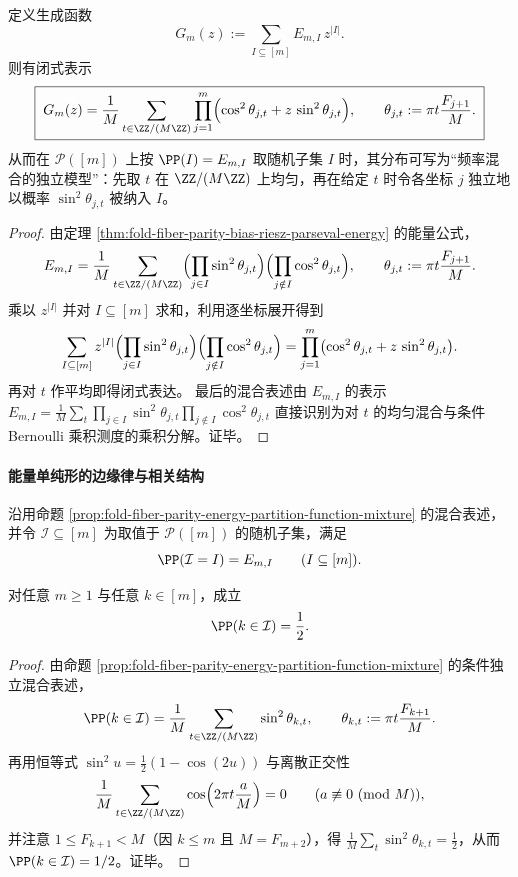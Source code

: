 \begin{proposition}[奇偶能量的生成函数与频率混合的独立模型]\label{prop:fold-fiber-parity-energy-partition-function-mixture}
定义生成函数
\[
G_m(z):=\sum_{I\subseteq[m]}E_{m,I}\,z^{|I|}.
\]
则有闭式表示
\[
\boxed{\;
G_m(z)=\frac1{M}\sum_{t\in\ZZ/(M\ZZ)}
\prod_{j=1}^{m}\Bigl(\cos^2\theta_{j,t}+z\,\sin^2\theta_{j,t}\Bigr),\qquad
\theta_{j,t}:=\pi t\frac{F_{j+1}}{M}.\;}
\]
从而在 \(\mathcal P([m])\) 上按 \(\PP(I)=E_{m,I}\) 取随机子集 \(I\) 时，其分布可写为“频率混合的独立模型”：先取 \(t\) 在 \(\ZZ/(M\ZZ)\) 上均匀，再在给定 \(t\) 时令各坐标 \(j\) 独立地以概率 \(\sin^2\theta_{j,t}\) 被纳入 \(I\)。
\end{proposition}
\begin{proof}
由定理 \ref{thm:fold-fiber-parity-bias-riesz-parseval-energy} 的能量公式，
\[
E_{m,I}=\frac1M\sum_{t\in\ZZ/(M\ZZ)}\Bigl(\prod_{j\in I}\sin^2\theta_{j,t}\Bigr)\Bigl(\prod_{j\notin I}\cos^2\theta_{j,t}\Bigr),
\qquad
\theta_{j,t}:=\pi t\frac{F_{j+1}}{M}.
\]
乘以 \(z^{|I|}\) 并对 \(I\subseteq[m]\) 求和，利用逐坐标展开得到
\[
\sum_{I\subseteq[m]}z^{|I|}\Bigl(\prod_{j\in I}\sin^2\theta_{j,t}\Bigr)\Bigl(\prod_{j\notin I}\cos^2\theta_{j,t}\Bigr)
=\prod_{j=1}^{m}\bigl(\cos^2\theta_{j,t}+z\,\sin^2\theta_{j,t}\bigr).
\]
再对 \(t\) 作平均即得闭式表达。
最后的混合表述由 \(E_{m,I}\) 的表示
\(
E_{m,I}=\frac1M\sum_t \prod_{j\in I}\sin^2\theta_{j,t}\prod_{j\notin I}\cos^2\theta_{j,t}
\)
直接识别为对 \(t\) 的均匀混合与条件 Bernoulli 乘积测度的乘积分解。证毕。
\end{proof}

\paragraph{能量单纯形的边缘律与相关结构}
沿用命题 \ref{prop:fold-fiber-parity-energy-partition-function-mixture} 的混合表述，并令 \(\mathcal I\subseteq[m]\) 为取值于 \(\mathcal P([m])\) 的随机子集，满足
\[
\PP(\mathcal I=I)=E_{m,I}\qquad(I\subseteq[m]).
\]

\begin{proposition}[能量单纯形的单点边缘严格无偏]\label{prop:fold-fiber-parity-energy-simplex-unbiased-marginal}
对任意 \(m\ge 1\) 与任意 \(k\in[m]\)，成立
\[
\PP(k\in\mathcal I)=\frac12.
\]
\end{proposition}
\begin{proof}
由命题 \ref{prop:fold-fiber-parity-energy-partition-function-mixture} 的条件独立混合表述，
\[
\PP(k\in\mathcal I)
=\frac1M\sum_{t\in\ZZ/(M\ZZ)}\sin^2\theta_{k,t},
\qquad
\theta_{k,t}:=\pi t\frac{F_{k+1}}{M}.
\]
再用恒等式 \(\sin^2u=\frac12(1-\cos(2u))\) 与离散正交性
\[
\frac1M\sum_{t\in\ZZ/(M\ZZ)}\cos\Bigl(2\pi t\frac{a}{M}\Bigr)=0
\qquad(a\not\equiv 0\ (\mathrm{mod}\ M)),
\]
并注意 \(1\le F_{k+1}<M\)（因 \(k\le m\) 且 \(M=F_{m+2}\)），得
\(
\frac1M\sum_t\sin^2\theta_{k,t}=\frac12
\)，从而 \(\PP(k\in\mathcal I)=1/2\)。证毕。
\end{proof}

